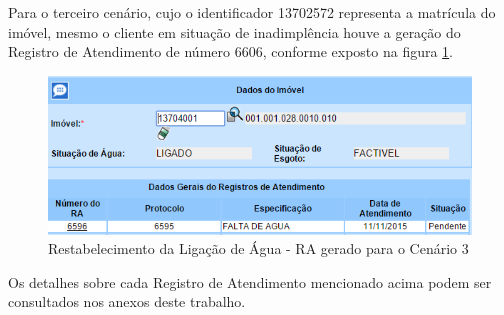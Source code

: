Para o terceiro cenário, cujo o identificador 13702572 representa a matrícula do imóvel, mesmo o cliente em situação de inadimplência houve a geração do Registro de Atendimento de número 6606, conforme exposto na figura \ref{figura:restabelecimentoRA3}.	

\begin{figure}[H]
	\centering
	\caption{Restabelecimento da Ligação de Água - RA gerado para o Cenário 3}
	\label{figura:restabelecimentoRA3}
	\includegraphics{figuras/cenarios/informar_falta_agua/resultado_3.PNG}
\end{figure}	

Os detalhes sobre cada Registro de Atendimento mencionado acima podem ser consultados nos anexos deste trabalho.


